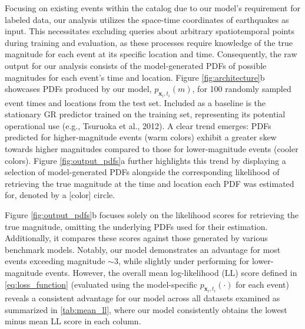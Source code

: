 \documentclass[pdflatex]{sn-jnl}
\begin{document}
Focusing on existing events within the catalog due to our model's requirement for labeled data, our analysis utilizes the space-time coordinates of earthquakes as input. This necessitates excluding queries about arbitrary spatiotemporal points during training and evaluation, as these processes require knowledge of the true magnitude for each event at its specific location and time. Consequently, the raw output for our analysis consists of the model-generated PDFs of possible magnitudes for each event's time and location. Figure \ref{fig:architecture}b showcases PDFs produced by our model, $p_{\textbf{x}_i, t_i}(m)$, for 100 randomly sampled event times and locations from the test set. Included as a baseline is the stationary GR predictor trained on the training set, representing its potential operational use (e.g., Tsuruoka et al., 2012). A clear trend emerges: PDFs predicted for higher-magnitude events (warm colors) exhibit a greater skew towards higher magnitudes compared to those for lower-magnitude events (cooler colors). Figure \ref{fig:output_pdfs}a further highlights this trend by displaying a selection of model-generated PDFs alongside the corresponding likelihood of retrieving the true magnitude at the time and location each PDF was estimated for, denoted by a [color] circle.

Figure \ref{fig:output_pdfs}b focuses solely on the likelihood scores for retrieving the true magnitude, omitting the underlying PDFs used for their estimation. Additionally, it compares these scores against those generated by various benchmark models. Notably, our model demonstrates an advantage for most events exceeding magnitude $\sim 3$, while slightly under performing for lower-magnitude events. However, the overall mean log-likelihood (LL) score defined in \ref{eq:loss_function} (evaluated using the model-specific $p_{\textbf{x}_i, t_i}(\cdot)$ for each event) reveals a consistent advantage for our model across all datasets examined as summarized in \ref{tab:mean_ll}, where our model consistently obtains the lowest minus mean LL score in each column.
\end{document}
